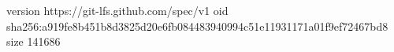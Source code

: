 version https://git-lfs.github.com/spec/v1
oid sha256:a919fe8b451b8d3825d20e6fb084483940994c51e11931171a01f9ef72467bd8
size 141686
